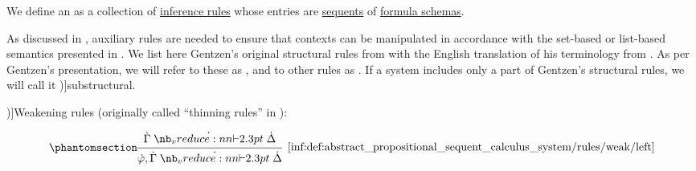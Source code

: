 \begin{definition}\label{def:abstract_propositional_sequent_calculus_system}\mimprovised
  We define an  as a collection of \hyperref[def:inference_rule]{inference rules} whose entries are \hyperref[def:sequent]{sequents} of \hyperref[def:propositional_formula_schema]{formula schemas}.

  As discussed in , auxiliary rules are needed to ensure that contexts can be manipulated in accordance with the set-based or list-based semantics presented in . We list here Gentzen's original structural rules from \cite[192]{Gentzen1935LogischeSchließen} with the English translation of his terminology from \cite[296]{Gentzen1964LogicalDeduction}. As per Gentzen's presentation, we will refer to these as , and to other rules as . If a system includes only a part of Gentzen's structural rules, we will call it \term[en=substructural (\cite[91]{TroelstraSchwichtenberg2000Proofs})]{substructural}.

  \begin{thmenum}
     \term[ru=правила добавления (\cite[217]{КолмогоровДрагалин2006Логика})]{Weakening rules} (originally called \enquote{thinning rules} in \cite[296]{Gentzen1964LogicalDeduction}):
    \begin{paracol}{2}
      \begin{leftcolumn}
        \begin{equation*}\taglabel[\ensuremath{ \logic{Weak}_L }]{inf:def:abstract_propositional_sequent_calculus_system/rules/weak/left}
          \begin{prooftree}
            \hypo{ \syn\Gamma \synvdash \syn\Delta }
            \infer1[\ref{inf:def:abstract_propositional_sequent_calculus_system/rules/weak/left}]{ \syn\varphi, \syn\Gamma \synvdash \syn\Delta }
          \end{prooftree}
        \end{equation*}
      \end{leftcolumn}


\end{paracol}
\end{thmenum}
\end{definition}
